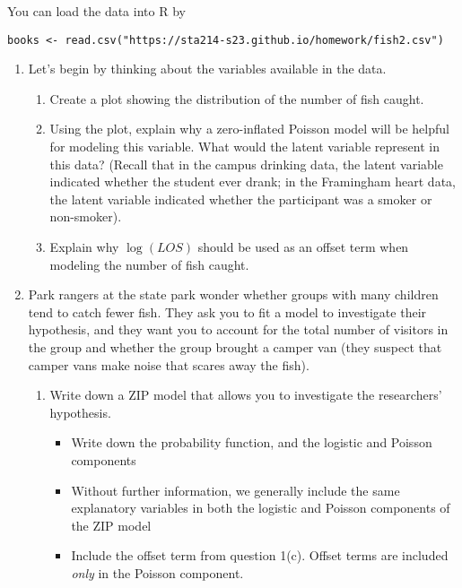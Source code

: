 \documentclass[11pt]{article}
\begin{document}
\noindent You can load the data into R by
\begin{verbatim}
books <- read.csv("https://sta214-s23.github.io/homework/fish2.csv")
\end{verbatim}

\begin{enumerate}

\item Let's begin by thinking about the variables available in the data.
\begin{enumerate}
\item Create a plot showing the distribution of the number of fish caught.


\item Using the plot, explain why a zero-inflated Poisson model will be helpful for modeling this variable. What would the latent variable represent in this data? (Recall that in the campus drinking data, the latent variable indicated whether the student ever drank; in the Framingham heart data, the latent variable indicated whether the participant was a smoker or non-smoker).

\item Explain why $\log(LOS)$ should be used as an offset term when modeling the number of fish caught.
\end{enumerate}

\item Park rangers at the state park wonder whether groups with many children tend to catch fewer fish. They ask you to fit a model to investigate their hypothesis, and they want you to account for the total number of visitors in the group and whether the group brought a camper van (they suspect that camper vans make noise that scares away the fish).

\begin{enumerate}
\item Write down a ZIP model that allows you to investigate the researchers' hypothesis.
\begin{itemize}
\item Write down the probability function, and the logistic and Poisson components
\item Without further information, we generally include the same explanatory variables in both the logistic and Poisson components of the ZIP model
\item Include the offset term from question 1(c). Offset terms are included \textit{only} in the Poisson component.
\end{itemize}


\end{enumerate}
\end{enumerate}
\end{document}
